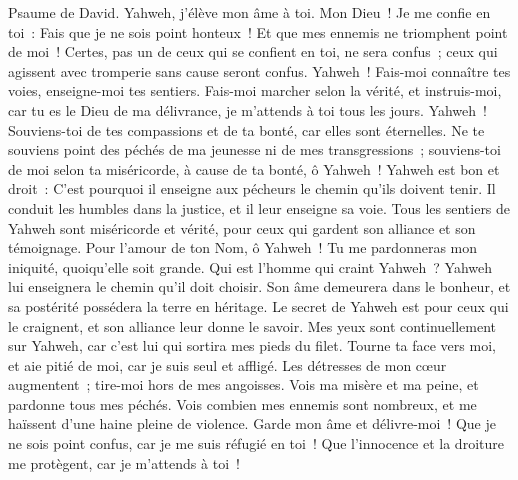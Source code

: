 \begin{multicols}{2}
\VerseOne{}Psaume de David.  Yahweh, j'élève mon âme à toi.
 Mon Dieu~! Je me confie en toi~: Fais que je ne sois point honteux~! Et que mes ennemis ne triomphent point de moi~!
 Certes, pas un de ceux qui se confient en toi, ne sera confus~; ceux qui agissent avec tromperie sans cause seront confus.
 Yahweh~! Fais-moi connaître tes voies, enseigne-moi tes sentiers.
 Fais-moi marcher selon la vérité, et instruis-moi, car tu es le Dieu de ma délivrance, je m'attends à toi tous les jours.
 Yahweh~! Souviens-toi de tes compassions et de ta bonté, car elles sont éternelles.
 Ne te souviens point des péchés de ma jeunesse ni de mes transgressions~; souviens-toi de moi selon ta miséricorde, à cause de ta bonté, ô Yahweh~!
 Yahweh est bon et droit~: C'est pourquoi il enseigne aux pécheurs le chemin qu'ils doivent tenir.
 Il conduit les humbles dans la justice, et il leur enseigne sa voie.
 Tous les sentiers de Yahweh sont miséricorde et vérité, pour ceux qui gardent son alliance et son témoignage.
 Pour l'amour de ton Nom, ô Yahweh~! Tu me pardonneras mon iniquité, quoiqu'elle soit grande.
 Qui est l'homme qui craint Yahweh~? Yahweh lui enseignera le chemin qu'il doit choisir.
 Son âme demeurera dans le bonheur, et sa postérité possédera la terre en héritage.
 Le secret de Yahweh est pour ceux qui le craignent, et son alliance leur donne le savoir.
 Mes yeux sont continuellement sur Yahweh, car c'est lui qui sortira mes pieds du filet.
 Tourne ta face vers moi, et aie pitié de moi, car je suis seul et affligé.
 Les détresses de mon cœur augmentent~; tire-moi hors de mes angoisses.
 Vois ma misère et ma peine, et pardonne tous mes péchés.
 Vois combien mes ennemis sont nombreux, et me haïssent d'une haine pleine de violence.
 Garde mon âme et délivre-moi~! Que je ne sois point confus, car je me suis réfugié en toi~!
 Que l'innocence et la droiture me protègent, car je m'attends à toi~!

\end{multicols}

